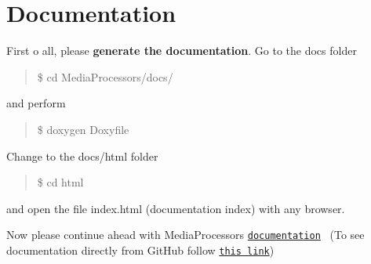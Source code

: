 \section*{Documentation }

First o all, please {\bfseries generate the documentation}. Go to the \textquotesingle{}docs\textquotesingle{} folder

\begin{quote}
\$ cd Media\+Processors/docs/ \end{quote}


and perform

\begin{quote}
\$ doxygen Doxyfile \end{quote}


Change to the \textquotesingle{}docs/html\textquotesingle{} folder

\begin{quote}
\$ cd html \end{quote}


and open the file \textquotesingle{}index.\+html\textquotesingle{} (documentation index) with any browser.

Now please continue ahead with Media\+Processors \href{md_DOCUMENTATION.html}{\tt documentation}~\newline
 (To see documentation directly from Git\+Hub follow \href{https://rantoniello.github.io/MediaProcessors/html/md_DOCUMENTATION.html}{\tt this link}) 
